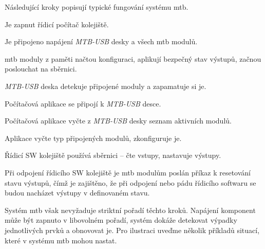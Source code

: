 Následující kroky popisují typické fungování systému \gls{mtb}.

\begin{compactenum}
\item Je zapnut řídicí počítač kolejiště.
\item Je připojeno napájení \textit{MTB-USB} desky a všech \gls{mtb} modulů.
\item \gls{mtb} moduly z paměti načtou konfiguraci, aplikují bezpečný stav
výstupů, začnou poslouchat na sběrnici.
\item \textit{MTB-USB} deska detekuje připojené moduly a zapamatuje si je.
\item Počítačová aplikace se připojí k \textit{MTB-USB} desce.
\item Počítačová aplikace vyčte z \textit{MTB-USB} desky seznam aktivních modulů.
\item Aplikace vyčte typ připojených modulů, zkonfiguruje je.
\item Řídicí SW kolejiště používá sběrnici – čte vstupy, nastavuje výstupy.
\item Při odpojení řídicího SW kolejiště je \gls{mtb} modulům poslán příkaz
	k resetování stavu výstupů, čímž je zajištěno, že při odpojení nebo pádu
	řídicího softwaru se budou nacházet výstupy v definovaném stavu.
\end{compactenum}

Systém \gls{mtb} však nevyžaduje striktní pořadí těchto kroků. Napájení
komponent může být zapnuto v libovolném pořadí, systém dokáže detekovat výpadky
jednotlivých prvků a obnovovat je. Pro ilustraci uveďme několik příkladů situací,
které v systému \gls{mtb} mohou nastat.

